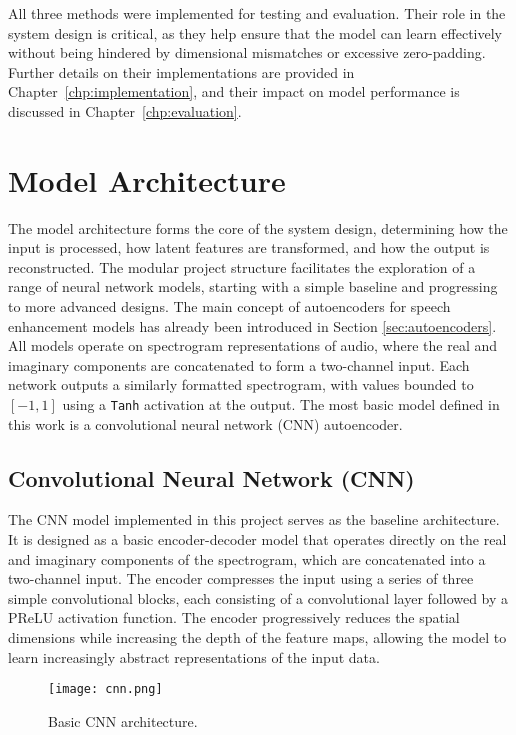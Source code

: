 All three methods were implemented for testing and evaluation. Their role in the system design is critical, as they help ensure that the model can learn effectively without being hindered by dimensional mismatches or excessive zero-padding. Further details on their implementations are provided in Chapter~\ref{chp:implementation}, and their impact on model performance is discussed in Chapter~\ref{chp:evaluation}.

\section{Model Architecture}
\label{sec:model_architecture}

The model architecture forms the core of the system design, determining how the input is processed, how latent features are transformed, and how the output is reconstructed. The modular project structure facilitates the exploration of a range of neural network models, starting with a simple baseline and progressing to more advanced designs. The main concept of autoencoders for speech enhancement models has already been introduced in Section \ref{sec:autoencoders}. All models operate on spectrogram representations of audio, where the real and imaginary components are concatenated to form a two-channel input. Each network outputs a similarly formatted spectrogram, with values bounded to \([-1, 1]\) using a \texttt{Tanh} activation at the output. The most basic model defined in this work is a convolutional neural network (CNN) autoencoder.

\subsection{Convolutional Neural Network (CNN)}
\label{sec:cnn}

The CNN model implemented in this project serves as the baseline architecture. It is designed as a basic encoder-decoder model that operates directly on the real and imaginary components of the spectrogram, which are concatenated into a two-channel input. The encoder compresses the input using a series of three simple convolutional blocks, each consisting of a convolutional layer followed by a PReLU activation function. The encoder progressively reduces the spatial dimensions while increasing the depth of the feature maps, allowing the model to learn increasingly abstract representations of the input data.

\begin{figure}[h]
    \centering
    \texttt{[image: cnn.png]}
    \caption{\label{fig:cnn}Basic CNN architecture.}
\end{figure}

